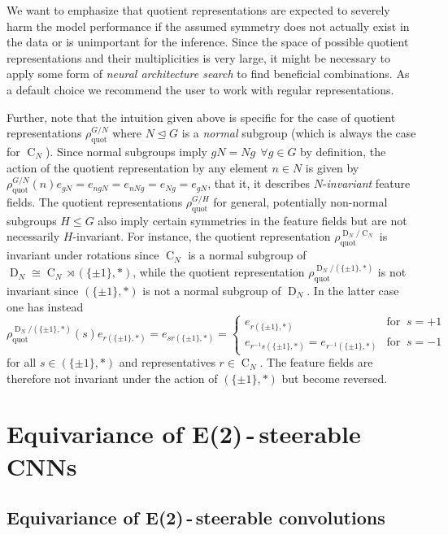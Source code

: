\documentclass{article}
\newcommand{\DN}{\ensuremath{\operatorname{D}_{\!N}}}
\newcommand{\CN}{\ensuremath{\operatorname{C}_{\!N}}}
\newcommand{\Flip}{(\{\pm 1\}, *)}
\begin{document}
We want to emphasize that quotient representations are expected to severely harm the model performance if the assumed symmetry does not actually exist in the data or is unimportant for the inference.
Since the space of possible quotient representations and their multiplicities is very large, it might be necessary to apply some form of \textit{neural architecture search} to find beneficial combinations.
As a default choice we recommend the user to work with regular representations.

Further, note that the intuition given above is specific for the case of quotient representations $\rho_\text{quot}^{G\!/\!N}$ where $N\trianglelefteq G$ is a \textit{normal} subgroup (which is always the case for $\CN$).
Since normal subgroups imply $gN\!=\!Ng\ \ \forall g\!\in\!G$ by definition, the action of the quotient representation by any element $n\in N$ is given by 
$\rho_\text{quot}^{G\!/\!N}(n)e_{gN} = e_{ngN} = e_{nNg} = e_{Ng} = e_{gN}$, that it, it describes $N$-\textit{invariant} feature fields.
The quotient representations $\rho_\text{quot}^{G\!/\!H}$ for general, potentially non-normal subgroups $H\leq G$ also imply certain symmetries in the feature fields but are not necessarily $H$-invariant.
For instance, the quotient representation $\rho_\text{quot}^{\DN\!/\!\CN}$ is invariant under rotations since $\CN$ is a normal subgroup of $\DN\cong\CN\rtimes\Flip$, while the quotient representation $\rho_\text{quot}^{\DN\!/\Flip}$ is not invariant since $\Flip$ is not a normal subgroup of $\DN$.
In the latter case one has instead
\[
    \rho_\text{quot}^{\DN\!/\Flip}(s) e_{r\Flip} = e_{sr\Flip} = 
    \begin{cases}
        e_{r\Flip}                         & \text{for }\ s=+1 \\
        e_{r^{-1}s\Flip} = e_{r^{-1}\Flip} & \text{for }\ s=-1
    \end{cases}
\]
for all $s\in\Flip$ and representatives $r\in\CN$.
The feature fields are therefore not invariant under the action of $\Flip$ but become reversed.


 	
\section{Equivariance of E(2)\,-\,steerable CNNs}

\subsection{Equivariance of E(2)\,-\,steerable convolutions}
\label{apx:equivariance_conv}
\end{document}
